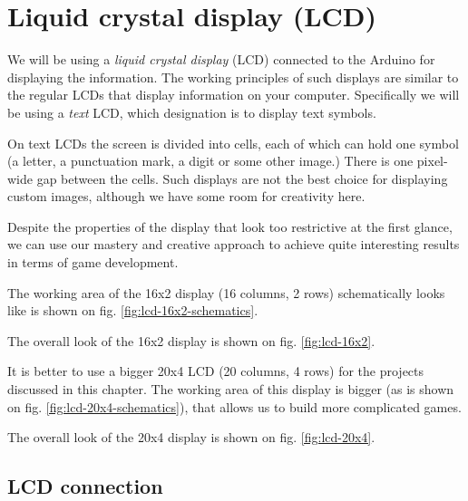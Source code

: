 \documentclass[../sparc.tex]{subfiles}
\begin{document}
\section{Liquid crystal display (LCD)}


We will be using a \emph{liquid crystal display} (LCD) connected to the Arduino
for displaying the information.  The working principles of such displays are
similar to the regular LCDs that display information on your computer.
Specifically we will be using a \emph{text} LCD, which designation is to display
text symbols.

On text LCDs the screen is divided into cells, each of which can hold one symbol
(a letter, a punctuation mark, a digit or some other image.)  There is one
pixel-wide gap between the cells.  Such displays are not the best choice for
displaying custom images, although we have some room for creativity here.

Despite the properties of the display that look too restrictive at the first
glance, we can use our mastery and creative approach to achieve quite
interesting results in terms of game development.

The working area of the 16x2 display (16 columns, 2 rows) schematically looks
like is shown on fig. \ref{fig:lcd-16x2-schematics}.


The overall look of the 16x2 display is shown on fig. \ref{fig:lcd-16x2}.


It is better to use a bigger 20x4 LCD (20 columns, 4 rows) for the projects
discussed in this chapter.  The working area of this display is bigger (as is
shown on fig. \ref{fig:lcd-20x4-schematics}), that allows us to build more
complicated games.


The overall look of the 20x4 display is shown on fig. \ref{fig:lcd-20x4}.


\subsection{LCD connection}
\end{document}
